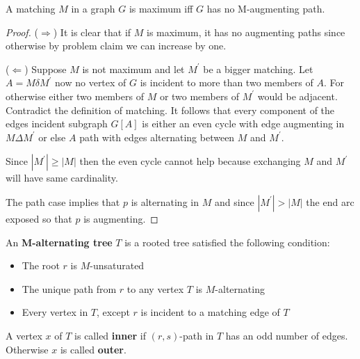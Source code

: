 			\begin{theorem}[Berge, 1957]
				A matching $M$ in a graph $G$ is maximum iff $G$ has no M-augmenting path.
			\end{theorem}

			\begin{figure}[!ht]
				\centering
			\end{figure}

			\begin{proof}
				($\Rightarrow$) It is clear that if $M$ is maximum, it has no augmenting paths since otherwise by problem claim we can increase by one.

				($\Leftarrow$) Suppose $M$ is not maximum and let $M^\prime$ be a bigger matching. Let $A = M \delta M^\prime$ now no vertex of $G$ is incident to more than two members of $A$. For otherwise either two members of $M$ or two members of $M^\prime$ would be adjacent. Contradict the definition of matching. It follows that every component of the edges incident subgraph $G[A]$ is either an even cycle with edge augmenting in $M\Delta M^\prime$ or else $A$ path with edges alternating between $M$ and $M^\prime$.

				Since $|M^\prime| \ge |M|$ then the even cycle cannot help because exchanging $M$ and $M^\prime$ will have same cardinality.

				The path case implies that $p$ is alternating in $M$ and since $|M^\prime| > |M|$ the end arc exposed so that $p$ is augmenting.
			\end{proof}

			\begin{definition}
				An \textbf{M-alternating tree} $T$ is a rooted tree satisfied the following condition:
				\begin{itemize}
					\item The root $r$ is $M$-unsaturated
					\item The unique path from $r$ to any vertex $T$ is $M$-alternating
					\item Every vertex in $T$, except $r$ is incident to a matching edge of $T$
				\end{itemize}
				A vertex $x$ of $T$ is called \textbf{inner} if $(r, s)$-path in $T$ has an odd number of edges. Otherwise $x$ is called \textbf{outer}.
			\end{definition}

